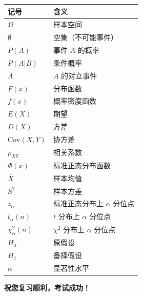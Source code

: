 \documentclass[12pt,a4paper]{ctexart}
\begin{document}
\begin{center}
    \begin{tabular}{@{}ll@{}}
        \toprule
        \textbf{记号}          & \textbf{含义}               \\
        \midrule
        $\Omega$             & 样本空间                      \\
        $\emptyset$          & 空集（不可能事件）                 \\
        $P(A)$               & 事件 $A$ 的概率                \\
        $P(A|B)$             & 条件概率                      \\
        $\bar{A}$            & $A$ 的对立事件                 \\
        $F(x)$               & 分布函数                      \\
        $f(x)$               & 概率密度函数                    \\
        $E(X)$               & 期望                        \\
        $D(X)$               & 方差                        \\
        $\text{Cov}(X,Y)$    & 协方差                       \\
        $\rho_{XY}$          & 相关系数                      \\
        $\Phi(x)$            & 标准正态分布函数                  \\
        $\bar{X}$            & 样本均值                      \\
        $S^2$                & 样本方差                      \\
        $z_{\alpha}$         & 标准正态分布上 $\alpha$ 分位点      \\
        $t_{\alpha}(n)$      & $t$ 分布上 $\alpha$ 分位点      \\
        $\chi^2_{\alpha}(n)$ & $\chi^2$ 分布上 $\alpha$ 分位点 \\
        $H_0$                & 原假设                       \\
        $H_1$                & 备择假设                      \\
        $\alpha$             & 显著性水平                     \\
        \bottomrule
    \end{tabular}
\end{center}

\vspace{3em}
\begin{center}
    \Large \textbf{祝您复习顺利，考试成功！}
\end{center}
\end{document}
